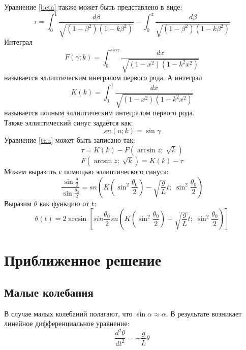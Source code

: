 \documentclass[a4paper,12pt]{article}
\begin{document}
Уравнение \eqref{beta} также может быть представлено в виде:
\begin{equation}\label{tau}
    \tau = \int_{0}^{1}\dfrac{d\beta}{\sqrt{(1-\beta^2)(1-k\beta^2)}} -
    \int_{0}^{z}\dfrac{d\beta}{\sqrt{(1-\beta^2)(1-k\beta^2)}}
\end{equation}
Интеграл
\begin{equation}
    F\left(\gamma; k\right) = \int_{0}^{sin{\gamma}}\dfrac{dx}{\sqrt{(1-x^2)(1-k^2x^2)}}
\end{equation}
называется эллиптическим инегралом первого рода. А интеграл
\begin{equation}
    K(k) = \int_{0}^{1}\dfrac{dx}{\sqrt{(1-x^2)(1-k^2x^2)}}
\end{equation}
называется полным эллиптическим интегралом первого рода.
\\Также эллиптический синус задаётся как:
\begin{equation}
    sn(u; k) = \sin{\gamma}
\end{equation}
Уравнение \eqref{tau}  может быть записано так:
\begin{equation}
    \tau = K(k) - F\left(\arcsin{z};\; \sqrt{k}\right)
\end{equation}
\begin{equation}
    F\left(\arcsin{z};\; \sqrt{k}\right) = K(k) - \tau
\end{equation}
Можем выразить с помощью эллиптического синуса:
\begin{equation}
    \dfrac{\sin{\frac{\theta}{2}}}{\sin{\frac{\theta_0}{2}}} =
    sn\left(K\left(\sin^2{\dfrac{\theta_0}{2}}\right) -
    \sqrt{\frac{g}{L}}t;\; \sin^2{\frac{\theta_0}{2}}\right)
\end{equation}
Выразим $\theta$ как функцию от t:
\begin{equation}
    \theta(t) = 2\arcsin{\left[
    sin{\dfrac{\theta_0}{2}}sn\left(K\left(\sin^2{\dfrac{\theta_0}{2}}\right) -
    \sqrt{\frac{g}{L}}t;\; \sin^2{\frac{\theta_0}{2}}\right)\right]}
\end{equation}

\section{Приближенное решение}

\subsection{Малые колебания}

В случае малых колебаний полагают, что  $\sin{\alpha} \approx  \alpha$.  В результате возникает линейное дифференциальное уравнение:
\begin{equation}
\frac{d^2\theta}{dt^2} = -\frac{g}{L}\theta
\end{equation}
\end{document}

